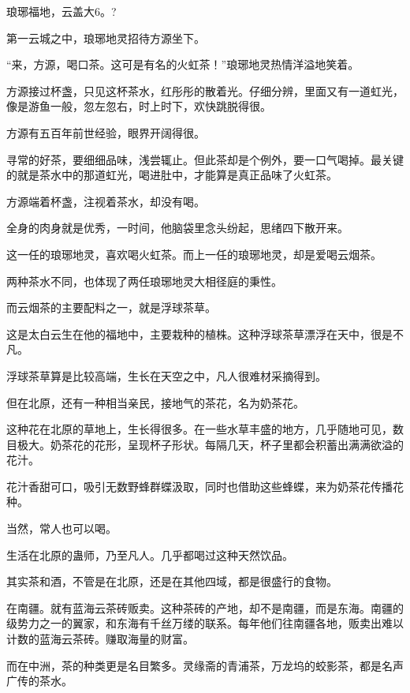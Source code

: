 
\begin{this_body}

琅琊福地，云盖大6。?

第一云城之中，琅琊地灵招待方源坐下。

“来，方源，喝口茶。这可是有名的火虹茶！”琅琊地灵热情洋溢地笑着。

方源接过杯盏，只见这杯茶水，红彤彤的散着光。仔细分辨，里面又有一道虹光，像是游鱼一般，忽左忽右，时上时下，欢快跳脱得很。

方源有五百年前世经验，眼界开阔得很。

寻常的好茶，要细细品味，浅尝辄止。但此茶却是个例外，要一口气喝掉。最关键的就是茶水中的那道虹光，喝进肚中，才能算是真正品味了火虹茶。

方源端着杯盏，注视着茶水，却没有喝。

全身的肉身就是优秀，一时间，他脑袋里念头纷起，思绪四下散开来。

这一任的琅琊地灵，喜欢喝火虹茶。而上一任的琅琊地灵，却是爱喝云烟茶。

两种茶水不同，也体现了两任琅琊地灵大相径庭的秉性。

而云烟茶的主要配料之一，就是浮球茶草。

这是太白云生在他的福地中，主要栽种的植株。这种浮球茶草漂浮在天中，很是不凡。

浮球茶草算是比较高端，生长在天空之中，凡人很难材采摘得到。

但在北原，还有一种相当亲民，接地气的茶花，名为奶茶花。

这种花在北原的草地上，生长得很多。在一些水草丰盛的地方，几乎随地可见，数目极大。奶茶花的花形，呈现杯子形状。每隔几天，杯子里都会积蓄出满满欲溢的花汁。

花汁香甜可口，吸引无数野蜂群蝶汲取，同时也借助这些蜂蝶，来为奶茶花传播花种。

当然，常人也可以喝。

生活在北原的蛊师，乃至凡人。几乎都喝过这种天然饮品。

其实茶和酒，不管是在北原，还是在其他四域，都是很盛行的食物。

在南疆。就有蓝海云茶砖贩卖。这种茶砖的产地，却不是南疆，而是东海。南疆的级势力之一的翼家，和东海有千丝万缕的联系。每年他们往南疆各地，贩卖出难以计数的蓝海云茶砖。赚取海量的财富。

而在中洲，茶的种类更是名目繁多。灵缘斋的青浦茶，万龙坞的蛟影茶，都是名声广传的茶水。


\end{this_body}
